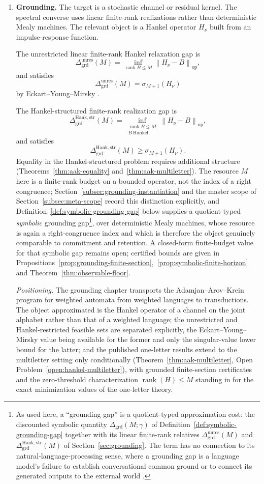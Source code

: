 \documentclass[12pt]{article}
\theoremstyle{definition}
\DeclareMathOperator{\rank}{rank}
\newcommand{\norm}[1]{\left\lVert#1\right\rVert}
\newcommand{\Dunres}{\Delta_{\mathrm{grd}}^{\mathrm{unres}}}
\newcommand{\DHankstr}{\Delta_{\mathrm{grd}}^{\mathrm{Hank,str}}}
\begin{document}
\begin{enumerate}[label=(\arabic*),leftmargin=2.2em]
\item \textbf{Grounding.}
The target is a stochastic channel or residual kernel.  The spectral converse
uses linear finite-rank realizations rather than deterministic Mealy
machines.  The relevant object is a Hankel operator $H_\nu$ built from an
impulse-response function.

The unrestricted linear finite-rank Hankel relaxation gap is
\[
\Dunres(M)
=
\inf_{\operatorname{rank}B\le M}
\norm{H_\nu-B}_{\mathrm{op}},
\]
and satisfies
\[
\Dunres(M)
=
\sigma_{M+1}(H_\nu)
\]
by Eckart--Young--Mirsky \cite{eckart1936,mirsky1960}.

The Hankel-structured finite-rank realization gap is
\[
\DHankstr(M)
=
\inf_{\substack{
\operatorname{rank}B\le M\\
B\ \text{Hankel}
}}
\norm{H_\nu-B}_{\mathrm{op}},
\]
and satisfies
\[
\DHankstr(M)
\ge
\sigma_{M+1}(H_\nu).
\]
Equality in the Hankel-structured problem requires additional structure
(Theorems~\ref{thm:aak-equality} and~\ref{thm:aak-multiletter}).  The
resource $M$ here is a finite-rank budget on a bounded operator, not the
index of a right congruence; Section~\ref{subsec:grounding-instantiation} and
the master scope of Section~\ref{subsec:meta-scope} record this distinction
explicitly, and Definition~\ref{def:symbolic-grounding-gap} below supplies a
quotient-typed \emph{symbolic} grounding
gap\footnote{As used here, a ``grounding gap'' is a quotient-typed
approximation cost: the discounted symbolic quantity
$\Delta_{\mathrm{grd}}(M;\gamma)$ of
Definition~\ref{def:symbolic-grounding-gap} together with its linear
finite-rank relatives $\Dunres(M)$ and $\DHankstr(M)$ of
Section~\ref{sec:grounding}.  The term has no connection to its
natural-language-processing sense, where a grounding gap is a language
model's failure to establish conversational common ground or to connect its
generated outputs to the external world \cite{shaikh2023grounding}.}, over
deterministic Mealy machines, whose resource is again a right-congruence
index and which is
therefore the object genuinely comparable to commitment and retention.  A
closed-form finite-budget value for that symbolic gap remains open; certified
bounds are given in
Propositions~\ref{prop:grounding-finite-section},~\ref{prop:symbolic-finite-horizon}
and Theorem~\ref{thm:observable-floor}.

\emph{Positioning.}  The grounding chapter transports the
Adamjan--Arov--Krein program for weighted automata
\cite{balle2021,lacroce2024} from weighted languages to transductions.  The
object approximated is the Hankel operator of a channel on the joint alphabet
rather than that of a weighted language; the unrestricted and
Hankel-restricted feasible sets are separated explicitly, the
Eckart--Young--Mirsky value being available for the former and only the
singular-value lower bound for the latter; and the published one-letter
results extend to the multiletter setting only conditionally
(Theorem~\ref{thm:aak-multiletter}, Open Problem~\ref{open:hankel-multiletter}),
with grounded finite-section certificates and the zero-threshold
characterization $\rank(H)\le M$ standing in for the exact minimization values
of the one-letter theory.
\end{enumerate}
\end{document}
